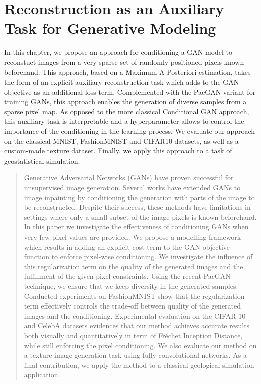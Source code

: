 \chapter{Reconstruction as an Auxiliary Task for Generative Modeling}
\label{chap:chapter2}

\begin{chapterabstract}
	In this chapter, we propose an approach for conditioning a GAN model to reconstuct images from a very sparse set of randomly-positioned pixels known beforehand. This approach, based on a Maximum A Posteriori estimation, takes the form of an explicit auxiliary reconstruction task which adds to the GAN objective as an additional loss term. Complemented with the PacGAN variant for training GANs, this approach enables the generation of diverse samples from a sparse pixel map. As opposed to the more classical Conditional GAN approach, this auxiliary task is interpretable and a hyperparameter allows to control the importance of the conditioning in the learning process. We evaluate our approach on the classical MNIST, FashionMNIST and CIFAR10 datasets, as well as a custom-made texture dataset. Finally,  we apply this approach to a task of geostatistical simulation.
\end{chapterabstract}

\minitoc

\begin{abstract}
	Generative Adversarial Networks (GANs) have proven successful for unsupervised image generation. Several works have extended GANs to image inpainting by conditioning the generation with parts of the image to be reconstructed. Despite their success, these methods have limitations in settings where only a small subset of the image pixels is known beforehand. In this paper we investigate the effectiveness of conditioning GANs when very few pixel values are provided. We propose a modelling framework which results in adding an explicit cost term to the GAN objective function to enforce pixel-wise conditioning. We investigate the influence of this regularization term on the quality of the generated images and the fulfillment of the given pixel constraints. Using the recent PacGAN technique, we ensure that we keep diversity in the generated samples. Conducted experiments on FashionMNIST show that the regularization term effectively controls the trade-off between quality of the generated images and the conditioning. Experimental evaluation on the CIFAR-10 and CelebA datasets evidences that our method achieves accurate results both visually and quantitatively in term of Fréchet Inception Distance, while still enforcing the pixel conditioning. We also evaluate our method on a texture image generation task using fully-convolutional networks. As a final contribution, we apply the method to a classical geological simulation application.
\end{abstract}

